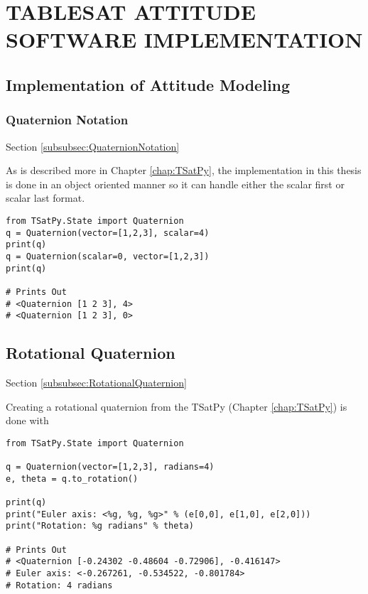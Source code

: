 
\chapter{TABLESAT ATTITUDE SOFTWARE IMPLEMENTATION}
\label{chap:TableSatAttitudeDynamicsSoftware}


\section{Implementation of Attitude Modeling}
\label{sec:ImplementationofAttitudeModeling}


\subsection{Quaternion Notation}
\label{subsec:Implementation-QuaternionNotation}
Section \ref{subsubsec:QuaternionNotation}

As is described more in Chapter \ref{chap:TSatPy}, the implementation in this thesis is done in an object oriented manner so it can handle either the scalar first or scalar last format.

\begin{singlespace}
  \begin{verbatim}
from TSatPy.State import Quaternion
q = Quaternion(vector=[1,2,3], scalar=4)
print(q)
q = Quaternion(scalar=0, vector=[1,2,3])
print(q)

# Prints Out
# <Quaternion [1 2 3], 4>
# <Quaternion [1 2 3], 0>
  \end{verbatim}
  \nocite{minted}
\end{singlespace}

\section{Rotational Quaternion}
\label{sec:Implementation-RotationalQuaternion}
Section \ref{subsubsec:RotationalQuaternion}

Creating a rotational quaternion from the TSatPy (Chapter \ref{chap:TSatPy}) is done with

\begin{singlespace}
  \begin{verbatim}
from TSatPy.State import Quaternion

q = Quaternion(vector=[1,2,3], radians=4)
e, theta = q.to_rotation()

print(q)
print("Euler axis: <%g, %g, %g>" % (e[0,0], e[1,0], e[2,0]))
print("Rotation: %g radians" % theta)

# Prints Out
# <Quaternion [-0.24302 -0.48604 -0.72906], -0.416147>
# Euler axis: <-0.267261, -0.534522, -0.801784>
# Rotation: 4 radians
  \end{verbatim}
  \nocite{minted}
\end{singlespace}


